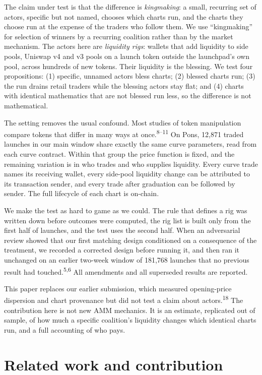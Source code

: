 \documentclass{ledger}
\newcommand{\n}[1]{\textsuperscript{#1}}
\begin{document}
The claim under test is that the difference is \emph{kingmaking}: a small, recurring set of actors, specific but not named, chooses which charts run, and the charts they choose run at the expense of the traders who follow them. We use ``kingmaking'' for selection of winners by a recurring coalition rather than by the market mechanism. The actors here are \emph{liquidity rigs}: wallets that add liquidity to side pools, Uniswap v4 and v3 pools on a launch token outside the launchpad's own pool, across hundreds of new tokens. Their liquidity is the blessing. We test four propositions: (1) specific, unnamed actors bless charts; (2) blessed charts run; (3) the run drains retail traders while the blessing actors stay flat; and (4) charts with identical mathematics that are not blessed run less, so the difference is not mathematical.

The setting removes the usual confound. Most studies of token manipulation compare tokens that differ in many ways at once.\n{8--11} On Pons, 12,871 traded launches in our main window share exactly the same curve parameters, read from each curve contract. Within that group the price function is fixed, and the remaining variation is in who trades and who supplies liquidity. Every curve trade names its receiving wallet, every side-pool liquidity change can be attributed to its transaction sender, and every trade after graduation can be followed by sender. The full lifecycle of each chart is on-chain.

We make the test as hard to game as we could. The rule that defines a rig was written down before outcomes were computed, the rig list is built only from the first half of launches, and the test uses the second half. When an adversarial review showed that our first matching design conditioned on a consequence of the treatment, we recorded a corrected design before running it, and then ran it unchanged on an earlier two-week window of 181,768 launches that no previous result had touched.\n{5,6} All amendments and all superseded results are reported.

This paper replaces our earlier submission, which measured opening-price dispersion and chart provenance but did not test a claim about actors.\n{18} The contribution here is not new AMM mechanics. It is an estimate, replicated out of sample, of how much a specific coalition's liquidity changes which identical charts run, and a full accounting of who pays.

\section{Related work and contribution}\label{related}
\end{document}
